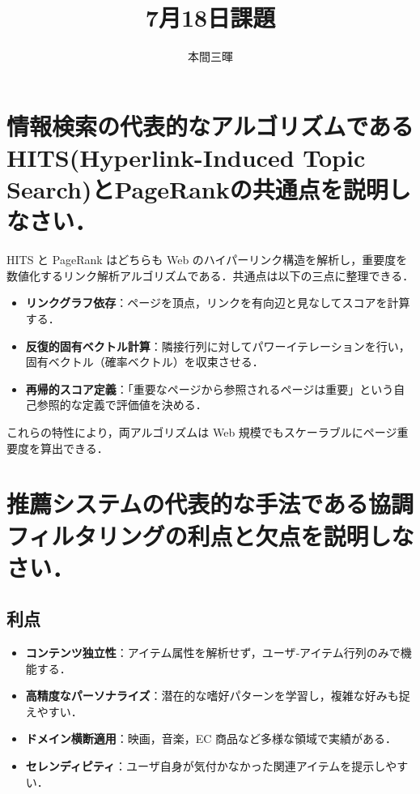 \documentclass[titlepage,a4paper]{jsarticle}
\title{7月18日課題}
\author{本間三暉}
\begin{document}
\maketitle

\section{情報検索の代表的なアルゴリズムであるHITS(Hyperlink-Induced Topic Search)とPageRankの共通点を説明しなさい．}

HITS と PageRank はどちらも Web のハイパーリンク構造を解析し，重要度を数値化するリンク解析アルゴリズムである\cite{text}．共通点は以下の三点に整理できる．

\begin{itemize}
  \item \textbf{リンクグラフ依存}：ページを頂点，リンクを有向辺と見なしてスコアを計算する\cite{hits-blog}\cite{pagerank-blog}．
  \item \textbf{反復的固有ベクトル計算}：隣接行列に対してパワーイテレーションを行い，固有ベクトル（確率ベクトル）を収束させる\cite{pagerank-blog}．
  \item \textbf{再帰的スコア定義}：「重要なページから参照されるページは重要」という自己参照的な定義で評価値を決める\cite{hits-blog}\cite{pagerank-blog}．
\end{itemize}

これらの特性により，両アルゴリズムは Web 規模でもスケーラブルにページ重要度を算出できる．


\section{推薦システムの代表的な手法である協調フィルタリングの利点と欠点を説明しなさい．}
\subsection*{利点}
\begin{itemize}
  \item \textbf{コンテンツ独立性}：アイテム属性を解析せず，ユーザ‐アイテム行列のみで機能する\cite{cf-udemy}．
  \item \textbf{高精度なパーソナライズ}：潜在的な嗜好パターンを学習し，複雑な好みも捉えやすい\cite{cf-udemy}．
  \item \textbf{ドメイン横断適用}：映画，音楽，EC 商品など多様な領域で実績がある\cite{cf-basic}．
  \item \textbf{セレンディピティ}：ユーザ自身が気付かなかった関連アイテムを提示しやすい\cite{cf-basic}．
\end{itemize}
\end{document}
